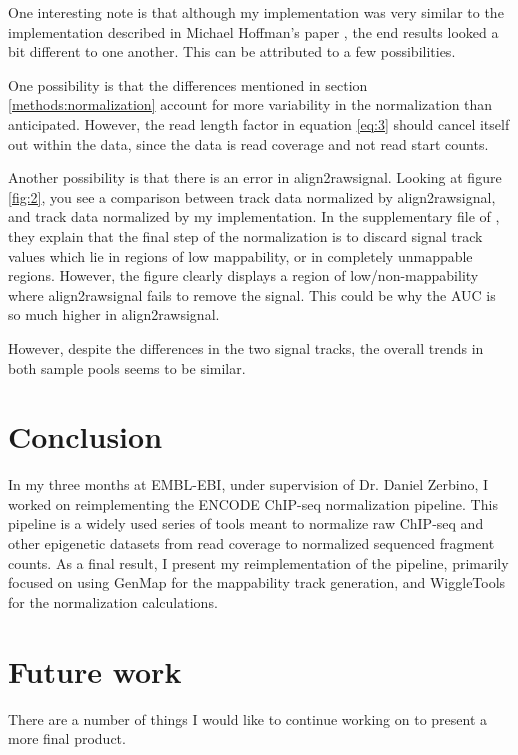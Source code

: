 \documentclass[a4paper]{article}
\begin{document}

    One interesting note is that although my implementation
    was very similar to the implementation described in Michael Hoffman's paper \cite{hoffman_integrative_2013}, the
    end results looked a bit different to one another. This can be attributed to a few possibilities.

    One possibility is that the differences mentioned in section \ref{methods:normalization} account for more variability
    in the normalization than anticipated. However, the read length factor in equation \ref{eq:3} should cancel itself out
    within the data, since the data is read coverage and not read start counts.

    Another possibility is that there is an error in align2rawsignal. Looking at figure \ref{fig:2}, you see a comparison
    between track data normalized by align2rawsignal, and track data normalized by my implementation. In the
    supplementary file of \cite{hoffman_integrative_2013}, they explain that the final step of the normalization is to
    discard signal track values which lie in regions of low mappability, or in completely unmappable regions. However,
    the figure clearly displays a region of low/non-mappability where align2rawsignal fails to remove the signal. This
    could be why the AUC is so much higher in align2rawsignal.

    However, despite the differences in the two signal tracks, the overall trends in both sample pools seems to be similar.

  \section{Conclusion}
  In my three months at EMBL-EBI, under supervision of Dr. Daniel Zerbino, I worked on reimplementing the ENCODE ChIP-seq
  normalization pipeline. This pipeline is a widely used series of tools meant to normalize raw ChIP-seq and other
  epigenetic datasets from read coverage to normalized sequenced fragment counts. As a final result, I present my
  reimplementation of the pipeline, primarily focused on using GenMap \cite{pockrandt_genmap:_2019} for the mappability
  track generation, and WiggleTools \cite{zerbino_wiggletools:_2014} for the normalization calculations.

  \section{Future work}
  There are a number of things I would like to continue working on to present a more final product.
\end{document}
